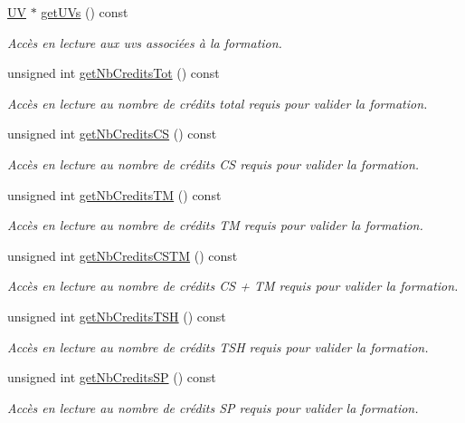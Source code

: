\begin{DoxyCompactItemize}
\hyperlink{class_u_v}{U\-V} $\ast$ \hyperlink{class_formation_ac0d4ca05416a8f09b1dd011e61a58ce9}{get\-U\-Vs} () const 
\begin{DoxyCompactList}\small\item\em Accès en lecture aux uvs associées à la formation. \end{DoxyCompactList}\item 
unsigned int \hyperlink{class_formation_a68bdd93c31f5aa091729aee3a16061be}{get\-Nb\-Credits\-Tot} () const 
\begin{DoxyCompactList}\small\item\em Accès en lecture au nombre de crédits total requis pour valider la formation. \end{DoxyCompactList}\item 
unsigned int \hyperlink{class_formation_a906d4493dc3de651618e34e7386c1952}{get\-Nb\-Credits\-C\-S} () const 
\begin{DoxyCompactList}\small\item\em Accès en lecture au nombre de crédits C\-S requis pour valider la formation. \end{DoxyCompactList}\item 
unsigned int \hyperlink{class_formation_aa71fe058c17323a5ed1e47714da68657}{get\-Nb\-Credits\-T\-M} () const 
\begin{DoxyCompactList}\small\item\em Accès en lecture au nombre de crédits T\-M requis pour valider la formation. \end{DoxyCompactList}\item 
unsigned int \hyperlink{class_formation_a7be30b6d06a72cb64d1d2163a632be59}{get\-Nb\-Credits\-C\-S\-T\-M} () const 
\begin{DoxyCompactList}\small\item\em Accès en lecture au nombre de crédits C\-S + T\-M requis pour valider la formation. \end{DoxyCompactList}\item 
unsigned int \hyperlink{class_formation_ac7dc1e1c6c8daecd85ae61e71987174b}{get\-Nb\-Credits\-T\-S\-H} () const 
\begin{DoxyCompactList}\small\item\em Accès en lecture au nombre de crédits T\-S\-H requis pour valider la formation. \end{DoxyCompactList}\item 
unsigned int \hyperlink{class_formation_a8c0730ec60fa46b4d5fd1d25ee073741}{get\-Nb\-Credits\-S\-P} () const 
\begin{DoxyCompactList}\small\item\em Accès en lecture au nombre de crédits S\-P requis pour valider la formation. \end{DoxyCompactList}\end{DoxyCompactItemize}


